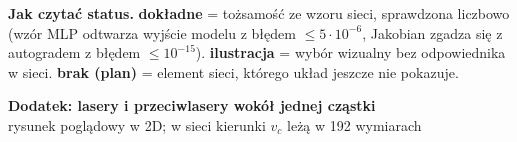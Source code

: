 \documentclass[a4paper,landscape,11pt]{article}
\newcommand{\DOK}{\textcolor{dok}{\textbf{dokładne}}}
\newcommand{\ILU}{\textcolor{ilu}{\textbf{ilustracja}}}
\newcommand{\PLAN}{\textcolor{uwaga}{\textbf{brak (plan)}}}
\begin{document}
\begin{minipage}[t]{0.58\linewidth}
\vspace{2mm}
\textbf{Jak czytać status.} \DOK{} = tożsamość ze wzoru sieci, sprawdzona liczbowo (wzór MLP odtwarza wyjście modelu z błędem
$\le5\cdot10^{-6}$, Jakobian zgadza się z autogradem z błędem $\le10^{-15}$). \ILU{} = wybór wizualny bez odpowiednika w sieci.
\PLAN{} = element sieci, którego układ jeszcze nie pokazuje.
\end{minipage}

\newpage
\begin{center}
{\LARGE\bfseries Dodatek: lasery i przeciwlasery wokół jednej cząstki}\\[2pt]
{\small rysunek poglądowy w 2D; w sieci kierunki $v_c$ leżą w 192 wymiarach}
\end{center}
\end{document}
